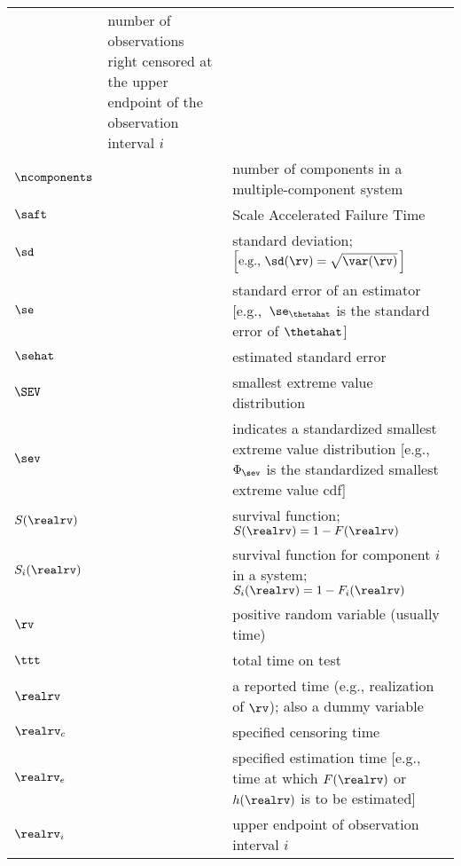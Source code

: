 \begin{supertabular}{p{0.9in}lp{4.0in}}
&number of observations right 
censored at the upper endpoint of the
observation interval $i$
   \\
$\ncomponents$      & 
& number of components in a multiple-component system
    \\
$\saft$      & 
& Scale Accelerated Failure Time
   \\
$\sd$      & 
&standard deviation; $ \left [\mbox{e.g.,}\,\, \sd(\rv)=\sqrt{\var(\rv)}\, \right ]$
   \\
$\se$       & 
&standard error of an estimator [e.g.,\,  $\se_{\thetahat}$ is the standard error
of $\thetahat$]
   \\
$\sehat$    & 
&estimated standard error
   \\
$\SEV$      & 
&smallest extreme value distribution
   \\
$\sev$      & 
&indicates a standardized smallest extreme value distribution 
[e.g.,  $\Phi_{\sev}$ is the standardized smallest extreme 
value cdf]
   \\
$S(\realrv)$ &
       &
survival function;
$S(\realrv)=1-F(\realrv)$
   \\
$S_{i}(\realrv)$ &
       &
survival function for component  $i$
  in a system;
$S_{i}(\realrv)=1-F_{i}(\realrv)$
  \\
 $\rv$       & 
&positive random variable (usually time)
   \\
$\ttt$       & 
&total time on test
 \\
$\realrv$   & 
&a reported time (e.g., realization of $\rv$); also a dummy variable
 \\
$\realrv_{c}$   & 
&specified censoring time 
  \\
$\realrv_{e}$   & 
&specified estimation time [e.g., time at which $F(\realrv)$ or
  $h(\realrv)$ is to be estimated] 
\\$\realrv_{i}$ &
&upper endpoint of observation interval $i$ 

\end{supertabular}
